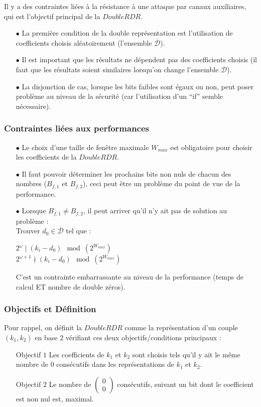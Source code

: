 \documentclass[12pt, a4paper]{memoir}
\newcommand{\doublezero}{\begin{pmatrix} 0 \\ 0 \end{pmatrix}}
\newcommand{\dbarre}{\overline{\mathcal{D}}}
\begin{document}
Il y a des contraintes liées à la résistance à une attaque par canaux auxiliaires, qui est l'objectif principal de la $DoubleRDR$.
\begin{itemize}
 \item [$\bullet$] La première condition de la double représentation est l'utilisation de coefficients choisis aléatoirement (l'ensemble $\overline{\mathcal{D}}$).
 \item [$\bullet$] Il est important que les résultats ne dépendent pas des coefficients choisis (il faut que 
 les résultats soient similaires lorsqu'on change l'ensemble $\mathcal{D}$).
 \item [$\bullet$] La disjonction de cas, lorsque les bits faibles sont égaux ou non, peut poser problème
 au niveau de la sécurité (car l'utilisation d'un ``if'' semble nécessaire).
 \end{itemize}

\subsubsection{Contraintes liées aux performances}

 
\begin{itemize}
 \item [$\bullet$] Le choix d'une taille de fenêtre maximale $W_{max}$ est obligatoire pour choisir les 
 coefficients de la $DoubleRDR$.
 \item [$\bullet$] Il faut pouvoir déterminer les prochains bits non nuls de chacun des nombres ($B_{f,1}$ et $B_{f,2}$), 
 ceci peut être un problème du point de vue de la performance.
 \item [$\bullet$] Lorsque $B_{f,1} \neq B_{f,2}$, il peut arriver qu'il n'y ait pas de solution au problème : \\
    Trouver $d_0 \in \dbarre$ tel que :
   \begin{center}
    $2^{\omega} \mid (k_i - d_0) \mod (2^{W_{max}})$ \\
    $2^{\omega+1} \nmid (k_i - d_0) \mod (2^{W_{max}})$
   \end{center}
 C'est un contrainte embarrassante au niveau de la performance (temps de calcul ET nombre de double zéros).
\end{itemize}

\subsubsection{Objectifs et Définition}

Pour rappel, on définit la $DoubleRDR$ comme la représentation d'un couple $(k_1 , k_2)$ en base $2$ 
vérifiant ces deux objectifs/conditions principaux :
\begin{itemize}
 \item [Objectif $1$] Les coefficients de $k_1$ et $k_2$ sont choisis tels qu'il y ait le même nombre de $0$
 consécutifs dans les représentations de $k_1$ et $k_2$.
 \item [Objectif $2$] Le nombre de $\doublezero$ consécutifs, suivant un bit dont le coefficient est non nul est, maximal. 
\end{itemize}
\end{document}
